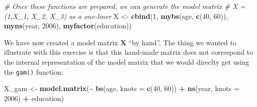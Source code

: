 \documentclass[
]{article}
\newenvironment{Shaded}{\begin{snugshade}}{\end{snugshade}}
\newcommand{\AttributeTok}[1]{\textcolor[rgb]{0.13,0.29,0.53}{#1}}
\newcommand{\CommentTok}[1]{\textcolor[rgb]{0.56,0.35,0.01}{\textit{#1}}}
\newcommand{\DecValTok}[1]{\textcolor[rgb]{0.00,0.00,0.81}{#1}}
\newcommand{\FunctionTok}[1]{\textcolor[rgb]{0.13,0.29,0.53}{\textbf{#1}}}
\newcommand{\NormalTok}[1]{#1}
\newcommand{\OtherTok}[1]{\textcolor[rgb]{0.56,0.35,0.01}{#1}}
\newcommand{\SpecialCharTok}[1]{\textcolor[rgb]{0.81,0.36,0.00}{\textbf{#1}}}
\begin{document}
\begin{Shaded}
\begin{Highlighting}[]
\CommentTok{\# Once these functions are prepared, we can generate the model matrix}
\CommentTok{\# X = (1,X\_1, X\_2, X\_3) as a one{-}liner}
\NormalTok{X }\OtherTok{\textless{}{-}} \FunctionTok{cbind}\NormalTok{(}\DecValTok{1}\NormalTok{, }\FunctionTok{mybs}\NormalTok{(age, }\FunctionTok{c}\NormalTok{(}\DecValTok{40}\NormalTok{, }\DecValTok{60}\NormalTok{)), }\FunctionTok{myns}\NormalTok{(year, }\DecValTok{2006}\NormalTok{), }\FunctionTok{myfactor}\NormalTok{(education))}
\end{Highlighting}
\end{Shaded}

We have now created a model matrix \(\mathbf X\) ``by hand''. The thing
we wanted to illustrate with this exercise is that this hand-made matrix
does not correspond to the internal representation of the model matrix
that we would direclty get using the \texttt{gam()} function:

\begin{Shaded}
\begin{Highlighting}[]
\NormalTok{X\_gam }\OtherTok{\textless{}{-}} \FunctionTok{model.matrix}\NormalTok{(}\SpecialCharTok{\textasciitilde{}} \FunctionTok{bs}\NormalTok{(age, }\AttributeTok{knots =} \FunctionTok{c}\NormalTok{(}\DecValTok{40}\NormalTok{, }\DecValTok{60}\NormalTok{)) }\SpecialCharTok{+} \FunctionTok{ns}\NormalTok{(year, }\AttributeTok{knots =} \DecValTok{2006}\NormalTok{) }\SpecialCharTok{+}\NormalTok{ education)}
\end{Highlighting}
\end{Shaded}

\begin{Shaded}
\end{Shaded}
\end{document}
